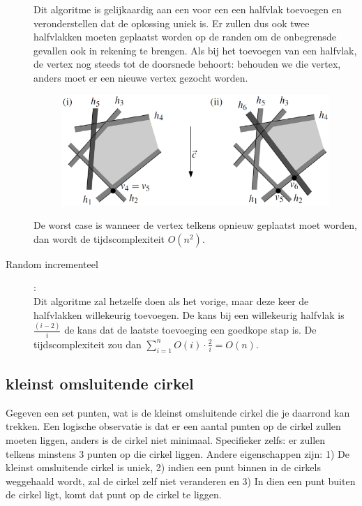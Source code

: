 \documentclass[12pt,a4paper]{article}
\begin{document}
\begin{description}
			Dit algoritme is gelijkaardig aan een voor een een halfvlak toevoegen en veronderstellen dat de oplossing uniek is. Er zullen dus ook twee halfvlakken moeten geplaatst worden op de randen om de onbegrensde gevallen ook in rekening te brengen. Als bij het toevoegen van een halfvlak, de vertex nog steeds tot de doorsnede behoort: behouden we die vertex, anders moet er een nieuwe vertex gezocht worden. 
			\begin{figure}[H]
				\centering
				\includegraphics[width=0.7\linewidth]{afbeeldingen/gietvorm-incrementeel}
				\label{fig:gietvorm-incrementeel}
			\end{figure}
			
			De worst case is wanneer de vertex telkens opnieuw geplaatst moet worden, dan wordt de tijdscomplexiteit $O(n^2)$.
		\item[Random incrementeel]:\\
			Dit algoritme zal hetzelfe doen als het vorige, maar deze keer de halfvlakken willekeurig toevoegen. De kans bij een willekeurig halfvlak is $\frac{(i-2)}{i}$ de kans dat de laatste toevoeging een goedkope stap is. De tijdscomplexiteit zou dan $\sum_{i=1}^n O(i)\cdot\frac{2}{i} = O(n)$.
	\end{description}
	
	
	\subsection{kleinst omsluitende cirkel}
	Gegeven een set punten, wat is de kleinst omsluitende cirkel die je daarrond kan trekken. Een logische observatie is dat er een aantal punten op de cirkel zullen moeten liggen, anders is de cirkel niet minimaal. Specifieker zelfs: er zullen telkens minstens 3 punten op die cirkel liggen. Andere eigenschappen zijn: 1) De kleinst omsluitende cirkel is uniek, 2) indien een punt binnen in de cirkels weggehaald wordt, zal de cirkel zelf niet veranderen en 3) In dien een punt buiten de cirkel ligt, komt dat punt op de cirkel te liggen. 
	
\end{document}
